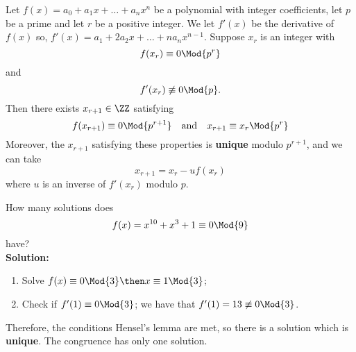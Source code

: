 \documentclass[12pt, a4paper]{article}
\begin{document}


\begin{mdthm}
    Let \(f(x)=a_0+a_1x+\ldots+a_nx^n\) be a polynomial with integer coefficients, let \(p\) be a prime and let \(r\) be a positive integer. We let \(f'(x)\) be the derivative of \(f(x)\) so, \(f'(x)=a_1+2a_2x+\ldots+na_n x^{n-1}\). Suppose \(x_r\) is an integer with
    \[f(x_r) \equiv 0 \Mod{p^r}\]
    and
    \[f'(x_r) \not\equiv 0 \Mod{p}.\]
    Then there exists \(x_{r+1}\in \ZZ\) satisfying
    \[f(x_{r+1}) \equiv 0 \Mod{p^{r+1}} \quad \text{and} \quad x_{r+1} \equiv x_r \Mod{p^r}\]
    Moreover, the \(x_{r+1}\) satisfying these properties is \textbf{unique} modulo \(p^{r+1}\), and we can take 
    \[x_{r+1} = x_r - uf(x_r)\]
    where \(u\) is an inverse of \(f'(x_r)\) modulo \(p\).
\end{mdthm}

\begin{example}
    How many solutions does
    \[f(x) = x^{10}+x^3+1 \equiv 0 \Mod{9}\]
    have? \\
    \textbf{Solution:}
    \begin{enumerate}
        \item Solve \(f(x) \equiv 0 \Mod{3} \then x\equiv 1 \Mod{3}\);
        \item Check if \(f'(1) \equiv 0 \Mod{3}\); we have that \(f'(1) =13 \not\equiv 0 \Mod{3}\). 
    \end{enumerate}
    Therefore, the conditions Hensel's lemma are met, so there is a solution which is \textbf{unique}. The congruence has only one solution.
\end{example}
\end{document}

